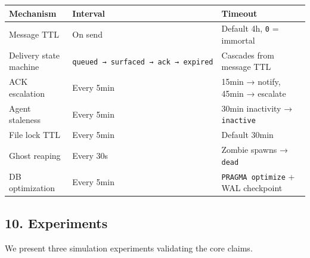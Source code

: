 \documentclass[11pt]{article}
\begin{document}
\begin{longtable}[]{@{}
  >{\raggedright\arraybackslash}p{}
  >{\raggedright\arraybackslash}p{}
  >{\raggedright\arraybackslash}p{}@{}}
\toprule\noalign{}
\begin{minipage}[b]{\linewidth}\raggedright
Mechanism
\end{minipage} & \begin{minipage}[b]{\linewidth}\raggedright
Interval
\end{minipage} & \begin{minipage}[b]{\linewidth}\raggedright
Timeout
\end{minipage} \\
\midrule\noalign{}
\endhead
\bottomrule\noalign{}
\endlastfoot
Message TTL & On send & Default 4h, \texttt{0} = immortal \\
Delivery state machine &
\texttt{queued\ →\ surfaced\ →\ ack\ →\ expired} & Cascades from message
TTL \\
ACK escalation & Every 5min & 15min → notify, 45min → escalate \\
Agent staleness & Every 5min & 30min inactivity → \texttt{inactive} \\
File lock TTL & Every 5min & Default 30min \\
Ghost reaping & Every 30s & Zombie spawns → \texttt{dead} \\
DB optimization & Every 5min & \texttt{PRAGMA\ optimize} + WAL
checkpoint \\
\end{longtable}

    \subsection{10. Experiments}\label{experiments}

We present three simulation experiments validating the core claims.

    \begin{center}
    \end{center}
    { \hspace*{\fill} \\}
    
    \begin{center}
    \end{center}
    { \hspace*{\fill} \\}
    
\end{document}
